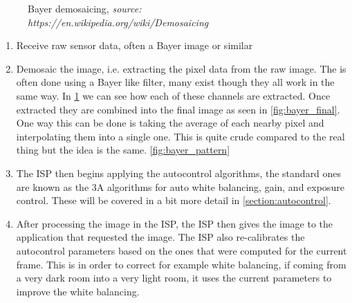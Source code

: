 \begin{figure}[htpb]
{    }
    \qquad
    \qquad

    \caption[Bayer demosaicing]{Bayer demosaicing, \textit{source: https://en.wikipedia.org/wiki/Demosaicing}}
    \label{fig:bayer_channels}
\end{figure}

\begin{enumerate}
    \item Receive raw sensor data, often a Bayer image or similar

    \item Demosaic the image, i.e. extracting the pixel data from the raw
        image. The is often done using a Bayer like filter, many exist though
        they all work in the same way. In \cref{fig:bayer_channels} we can see
        how each of these channels are extracted. Once extracted they are
        combined into the final image as seen in \cref{fig:bayer_final}. One
        way this can be done is taking the average of each nearby pixel and
        interpolating them into a single one. This is quite crude compared to
        the real thing but the idea is the same. \cref{fig:bayer_pattern}

    \item The ISP then begins applying the autocontrol algorithms, the standard
        ones are known as the 3A algorithms for auto white balancing, gain, and
        exposure control. These will be covered in a bit more detail in
        \cref{section:autocontrol}.

    \item After processing the image in the ISP, the ISP then gives the image
        to the application that requested the image. The ISP also re-calibrates
        the autocontrol parameters based on the ones that were computed for the
        current frame. This is in order to correct for example white balancing,
        if coming from a very dark room into a very light room, it uses the
        current parameters to improve the white balancing.

\end{enumerate}

